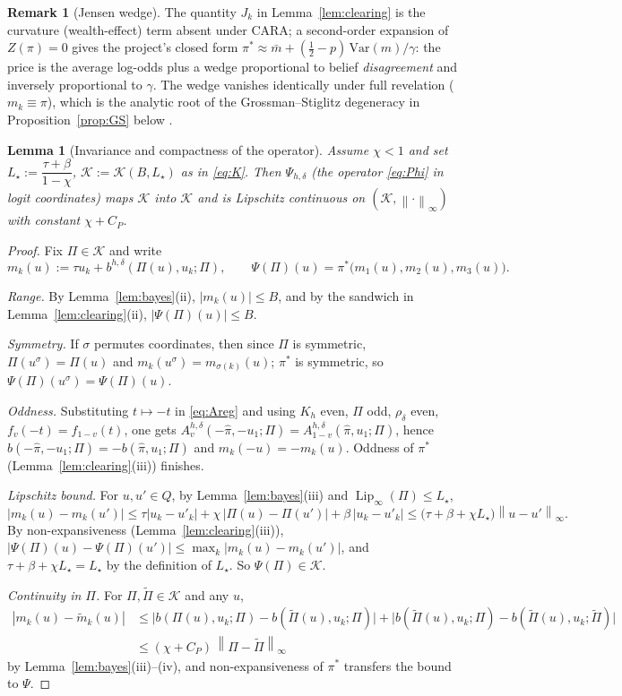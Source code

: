 \documentclass[11pt]{article}
\newtheorem{lemma}{Lemma}
\theoremstyle{definition}
\newtheorem{remark}{Remark}
\newcommand{\Lip}{\operatorname{Lip}}
\newcommand{\norm}[1]{\left\lVert #1 \right\rVert}
\newcommand{\Kc}{\mathcal{K}}
\begin{document}
\begin{remark}[Jensen wedge]\label{rem:jensen}
The quantity $J_k$ in Lemma~\ref{lem:clearing} is the curvature
(wealth-effect) term absent under CARA; a second-order expansion of
$Z(\pi)=0$ gives the project's closed form
$\pi^*\approx\bar m+(\tfrac12-p)\,\mathrm{Var}(m)/\gamma$: the price is the
average log-odds plus a wedge proportional to belief
\emph{disagreement} and inversely proportional to $\gamma$. The wedge
vanishes identically under full revelation ($m_k\equiv\pi$), which is the
analytic root of the Grossman--Stiglitz degeneracy in
Proposition~\ref{prop:GS} below \cite{REZN}.
\end{remark}

\begin{lemma}[Invariance and compactness of the operator]\label{lem:invariance}
Assume $\chi<1$ and set
$L_\star:=\dfrac{\tau+\beta}{1-\chi}$, $\Kc:=\Kc(B,L_\star)$ as in
\eqref{eq:K}. Then $\Psi_{h,\delta}$ (the operator \eqref{eq:Phi} in logit
coordinates) maps $\Kc$ into $\Kc$ and is Lipschitz continuous on
$(\Kc,\norm{\cdot}_\infty)$ with constant $\chi+C_P$.
\end{lemma}

\begin{proof}
Fix $\Pi\in\Kc$ and write
\[
m_k(u):=\tau u_k+b^{h,\delta}(\Pi(u),u_k;\Pi),
\qquad
\Psi(\Pi)(u)=\pi^*\big(m_1(u),m_2(u),m_3(u)\big).
\]

\emph{Range.} By Lemma~\ref{lem:bayes}(ii), $|m_k(u)|\le B$, and by the
sandwich in Lemma~\ref{lem:clearing}(ii), $|\Psi(\Pi)(u)|\le B$.

\emph{Symmetry.} If $\sigma$ permutes coordinates, then since $\Pi$ is
symmetric, $\Pi(u^\sigma)=\Pi(u)$ and
$m_k(u^\sigma)=m_{\sigma(k)}(u)$; $\pi^*$ is symmetric, so
$\Psi(\Pi)(u^\sigma)=\Psi(\Pi)(u)$.

\emph{Oddness.} Substituting $t\mapsto-t$ in \eqref{eq:Areg} and using
$K_h$ even, $\Pi$ odd, $\rho_\delta$ even, $f_v(-t)=f_{1-v}(t)$, one gets
$A^{h,\delta}_v(-\hat\pi,-u_1;\Pi)=A^{h,\delta}_{1-v}(\hat\pi,u_1;\Pi)$,
hence $b(-\hat\pi,-u_1;\Pi)=-b(\hat\pi,u_1;\Pi)$ and $m_k(-u)=-m_k(u)$.
Oddness of $\pi^*$ (Lemma~\ref{lem:clearing}(iii)) finishes.

\emph{Lipschitz bound.} For $u,u'\in Q$, by
Lemma~\ref{lem:bayes}(iii) and $\Lip_\infty(\Pi)\le L_\star$,
\[
|m_k(u)-m_k(u')|
\le \tau|u_k-u'_k|+\chi\,|\Pi(u)-\Pi(u')|+\beta\,|u_k-u'_k|
\le \big(\tau+\beta+\chi L_\star\big)\norm{u-u'}_\infty .
\]
By non-expansiveness (Lemma~\ref{lem:clearing}(iii)),
$|\Psi(\Pi)(u)-\Psi(\Pi)(u')|\le\max_k|m_k(u)-m_k(u')|$, and
$\tau+\beta+\chi L_\star=L_\star$ by the definition of $L_\star$. So
$\Psi(\Pi)\in\Kc$.

\emph{Continuity in $\Pi$.} For $\Pi,\tilde\Pi\in\Kc$ and any $u$,
\begin{align*}
|m_k(u)-\tilde m_k(u)|
&\le \big|b(\Pi(u),u_k;\Pi)-b(\tilde\Pi(u),u_k;\Pi)\big|
+\big|b(\tilde\Pi(u),u_k;\Pi)-b(\tilde\Pi(u),u_k;\tilde\Pi)\big|\\
&\le(\chi+C_P)\,\norm{\Pi-\tilde\Pi}_\infty
\end{align*}
by Lemma~\ref{lem:bayes}(iii)--(iv), and non-expansiveness of $\pi^*$
transfers the bound to $\Psi$.
\end{proof}
\end{document}
